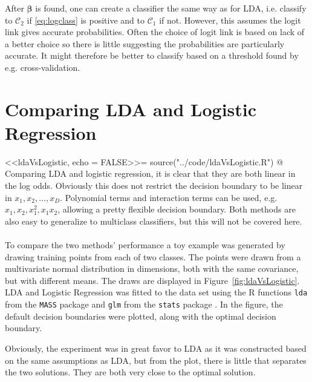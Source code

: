 After $\bm \beta$ is found, one can create a classifier the same way as for LDA, i.e. classify to $\mathcal{C}_2$ if \eqref{eq:logclass} is positive and to $\mathcal{C}_1$ if not. However, this assumes the logit link gives accurate probabilities. Often the choice of logit link is based on lack of a better choice so there is little suggesting the probabilities are particularly accurate. It might therefore be better to classify based on a threshold found by e.g. cross-validation.
%
\section{Comparing LDA and Logistic Regression}
\label{sub:LDA and Logistic Regre}
<<ldaVsLogistic, echo = FALSE>>=
source("../code/ldaVsLogistic.R")
@
Comparing LDA and logistic regression, it is clear that they are both linear in the log odds. Obviously this does not restrict the decision boundary to be linear in $x_1, x_2, \ldots , x_D$. Polynomial terms and interaction terms can be used, e.g. $x_1, x_2, x_1^2, x_1 x_2$, allowing a pretty flexible decision boundary. Both methods are also easy to generalize to multiclass classifiers, but this will not be covered here. 
\\
\\
To compare the two methods' performance a toy example was generated by drawing  training points from each of two classes. The points were drawn from a multivariate normal distribution in  dimensions, both with the same covariance, but with different means. The draws are displayed in Figure~\ref{fig:ldaVsLogistic}. LDA and Logistic Regression was fitted to the data set using the R functions \verb+lda+ from the \verb+MASS+ package \citep{mass} and \verb+glm+ from the \verb+stats+ package \citep{stats}. In the figure, the default decision boundaries were plotted, along with the optimal decision boundary.

Obviously, the experiment was in great favor to LDA as it was constructed based on the same assumptions as LDA, but from the plot, there is little that separates the two solutions. They are both very close to the optimal solution.

